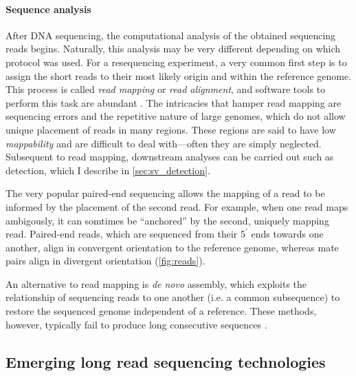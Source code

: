 \paragraph{Sequence analysis}
After DNA sequencing, the computational analysis of the obtained sequencing
reads begins. Naturally, this analysis may be very different depending on which
protocol was used. For a \wgs resequencing experiment, a very common first step
is to assign the short reads to their most likely origin and
 within the reference
genome. This process is called \emph{read mapping} or \emph{read alignment}, and
software tools to perform this task are abundant
\citep{Li2009,Weese2009,Langmead2009,Alkan2009,Li2013}. The intricacies that
hamper read mapping are sequencing errors and the repetitive nature of large
genomes, which do not allow unique placement of reads in many regions. These
regions are said to have low \emph{mappability} and are difficult to deal with---often they are simply neglected.
Subsequent to read mapping, downstream analyses can be carried out such as \sv
detection, which I describe in \cref{sec:sv_detection}.

The very popular paired-end sequencing allows the mapping of a read to be
informed by the placement of the second read. For example, when one read maps
ambigously, it can somtimes be ``anchored'' by the second, uniquely mapping read.
Paired-end reads, which are sequenced from their $5^\prime$ ends towards one
another, align in convergent orientation to the reference genome, whereas mate
pairs align in divergent orientation (\cref{fig:reads}).

An alternative to read mapping is \emph{de novo} assembly, which exploits the
relationship of sequencing reads to one another (i.e. a common subsequence) to
restore the sequenced genome independent of a reference. These methods, however,
typically fail to produce long consecutive sequences \citep{Alkan2011_assembly}.










\subsection{Emerging long read sequencing technologies}
\label{sec:long_read_seq}

